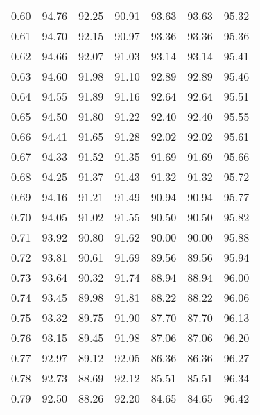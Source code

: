 \begin{tabular}{|c|c|c|c|c|c|c|}
      0.60 &     94.76 &     92.25 &      90.91 &   93.63 &      93.63 &         95.32 \\
      0.61 &     94.70 &     92.15 &      90.97 &   93.36 &      93.36 &         95.36 \\
      0.62 &     94.66 &     92.07 &      91.03 &   93.14 &      93.14 &         95.41 \\
      0.63 &     94.60 &     91.98 &      91.10 &   92.89 &      92.89 &         95.46 \\
      0.64 &     94.55 &     91.89 &      91.16 &   92.64 &      92.64 &         95.51 \\
      0.65 &     94.50 &     91.80 &      91.22 &   92.40 &      92.40 &         95.55 \\
      0.66 &     94.41 &     91.65 &      91.28 &   92.02 &      92.02 &         95.61 \\
      0.67 &     94.33 &     91.52 &      91.35 &   91.69 &      91.69 &         95.66 \\
      0.68 &     94.25 &     91.37 &      91.43 &   91.32 &      91.32 &         95.72 \\
      0.69 &     94.16 &     91.21 &      91.49 &   90.94 &      90.94 &         95.77 \\
      0.70 &     94.05 &     91.02 &      91.55 &   90.50 &      90.50 &         95.82 \\
      0.71 &     93.92 &     90.80 &      91.62 &   90.00 &      90.00 &         95.88 \\
      0.72 &     93.81 &     90.61 &      91.69 &   89.56 &      89.56 &         95.94 \\
      0.73 &     93.64 &     90.32 &      91.74 &   88.94 &      88.94 &         96.00 \\
      0.74 &     93.45 &     89.98 &      91.81 &   88.22 &      88.22 &         96.06 \\
      0.75 &     93.32 &     89.75 &      91.90 &   87.70 &      87.70 &         96.13 \\
      0.76 &     93.15 &     89.45 &      91.98 &   87.06 &      87.06 &         96.20 \\
      0.77 &     92.97 &     89.12 &      92.05 &   86.36 &      86.36 &         96.27 \\
      0.78 &     92.73 &     88.69 &      92.12 &   85.51 &      85.51 &         96.34 \\
      0.79 &     92.50 &     88.26 &      92.20 &   84.65 &      84.65 &         96.42 \\

\end{tabular}
